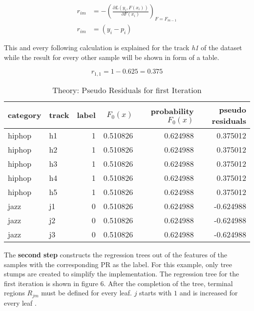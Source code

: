\begin{equation}
    \begin{aligned}
        r_{im} &= - (\frac{\partial L(y_{i}, F(x_{i}))}{\partial F(x_{i})})_{F = F_{m - 1}}
        \\
        r_{im} &= (y_{i} - p_{i})
    \end{aligned}
\end{equation}

This and every following calculation is explained for the track \emph{h1} of the dataset while the result for 
every other sample will be shown in form of a table. 

\begin{equation*}
r_{1,1} = 1 - 0.625 = 0.375
\end{equation*}

\begin{table}[H]
    \centering
    \begin{tabular}{llrrrr}
        \toprule
        category & track &  label & \(F_{0}(x)\) &  probability \(F_{0}(x)\) &  pseudo residuals \\
        \midrule
          hiphop &    h1 &      1 & 0.510826 &         0.624988 &            0.375012 \\
          hiphop &    h2 &      1 & 0.510826 &         0.624988 &            0.375012 \\
          hiphop &    h3 &      1 & 0.510826 &         0.624988 &            0.375012 \\
          hiphop &    h4 &      1 & 0.510826 &         0.624988 &            0.375012 \\
          hiphop &    h5 &      1 & 0.510826 &         0.624988 &            0.375012 \\
            jazz &    j1 &      0 & 0.510826 &         0.624988 &           -0.624988 \\
            jazz &    j2 &      0 & 0.510826 &         0.624988 &           -0.624988 \\
            jazz &    j3 &      0 & 0.510826 &         0.624988 &           -0.624988 \\
        \bottomrule
        \end{tabular} 
    \caption{Theory: Pseudo Residuals for first Iteration}%
    \label{tbl:theory_pseudo_residuals_1_iteration}%
  \end{table} 

The \textbf{second step} constructs the regression trees out of the features of the samples with the corresponding 
PR as the label. For this example, only tree stumps are created to simplify the implementation. 
The regression tree for the first iteration is shown in figure 6. After the completion of the 
tree, terminal regions \(R_{jm}\) must be defined for every leaf. \(j\) starts with \(1\) and is increased for 
every leaf \cite[p.1195]{Friedman_2001}. 

